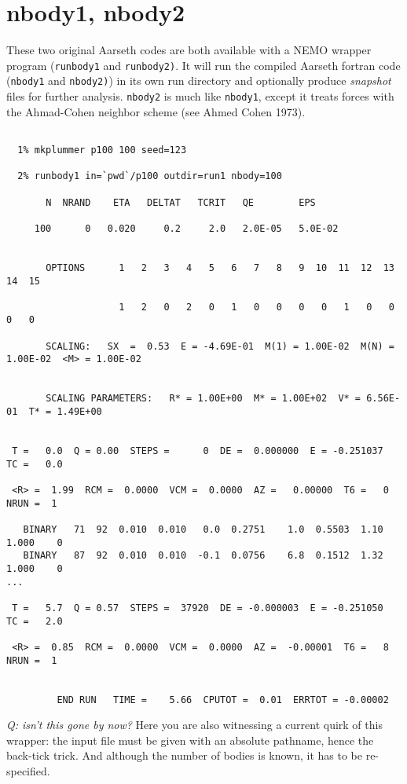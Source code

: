 \section{nbody1, nbody2}

These two original Aarseth codes are both available with a NEMO wrapper program
({\tt runbody1} and {\tt runbody2)}. It will run the compiled Aarseth fortran 
code ({\tt nbody1} and {\tt nbody2)})
in its own run directory and 
optionally produce {\it snapshot} files for further
analysis. {\tt nbody2}  is much like {\tt nbody1}, except it
treats forces with the Ahmad-Cohen neighbor scheme (see Ahmed Cohen 1973).

\footnotesize\begin{verbatim}

  1% mkplummer p100 100 seed=123

  2% runbody1 in=`pwd`/p100 outdir=run1 nbody=100

       N  NRAND    ETA   DELTAT   TCRIT   QE        EPS

     100      0   0.020     0.2     2.0   2.0E-05   5.0E-02
 
 
       OPTIONS      1   2   3   4   5   6   7   8   9  10  11  12  13  14  15

                    1   2   0   2   0   1   0   0   0   0   1   0   0   0   0
 
       SCALING:   SX  =  0.53  E = -4.69E-01  M(1) = 1.00E-02  M(N) = 1.00E-02  <M> = 1.00E-02
 

       SCALING PARAMETERS:   R* = 1.00E+00  M* = 1.00E+02  V* = 6.56E-01  T* = 1.49E+00
 
 
 T =   0.0  Q = 0.00  STEPS =      0  DE =  0.000000  E = -0.251037  TC =   0.0
 
 <R> =  1.99  RCM =  0.0000  VCM =  0.0000  AZ =   0.00000  T6 =   0  NRUN =  1
 
   BINARY   71  92  0.010  0.010   0.0  0.2751    1.0  0.5503  1.10  1.000    0
   BINARY   87  92  0.010  0.010  -0.1  0.0756    6.8  0.1512  1.32  1.000    0
...
 
 T =   5.7  Q = 0.57  STEPS =  37920  DE = -0.000003  E = -0.251050  TC =   2.0
 
 <R> =  0.85  RCM =  0.0000  VCM =  0.0000  AZ =  -0.00001  T6 =   8  NRUN =  1
 
 
         END RUN   TIME =    5.66  CPUTOT =  0.01  ERRTOT = -0.00002

\end{verbatim}\normalsize

{\it Q: isn't this gone by now?}
Here you are also witnessing a current quirk of this wrapper: the input file
must be given with an absolute pathname, hence the back-tick trick. And 
although the number of bodies is known, it has to be re-specified.

